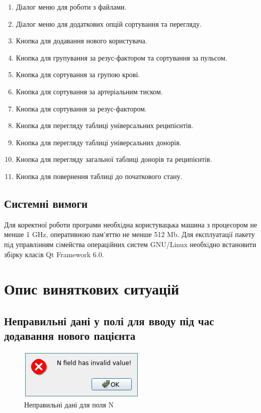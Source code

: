 \documentclass[oneside,14pt]{extarticle}
\begin{document}
\begin{enumerate}
	\item Діалог меню для роботи з файлами.
	\item Діалог меню для додаткових опцій сортування та перегляду.
	\item Кнопка для додавання нового користувача.
	\item Кнопка для групування за резус-фактором та сортування за пульсом.
	\item Кнопка для сортування за групою крові.
	\item Кнопка для сортування за артеріальним тиском.
	\item Кнопка для сортування за резус-фактором.
	\item Кнопка для перегляду таблиці універсальних реципієнтів.
	\item Кнопка для перегляду таблиці універсальних донорів.
	\item Кнопка для перегляду загальної таблиці донорів та реципієнтів.
	\item Кнопка для повернення таблиці до початкового стану.
\end{enumerate}

\subsection{Системні вимоги}
Для коректної роботи програми необхiдна користувацька машина з процесором не менше 1 GHz, оперативною пам’яттю не менше 512 Mb. Для експлуатацiї пакету пiд управлiнням сiмейства операцiйних систем GNU/Linux необхiдно встановити збiрку класiв Qt Framework 6.0.

\section{Опис виняткових ситуацій}
\subsection{Неправильні дані у полі для вводу під час додавання нового пацієнта}
\begin{figure}[H]
	\centering
	\includegraphics[scale=1]{14}
	\caption{Неправильні дані для поля N}
\end{figure}
\end{document}
